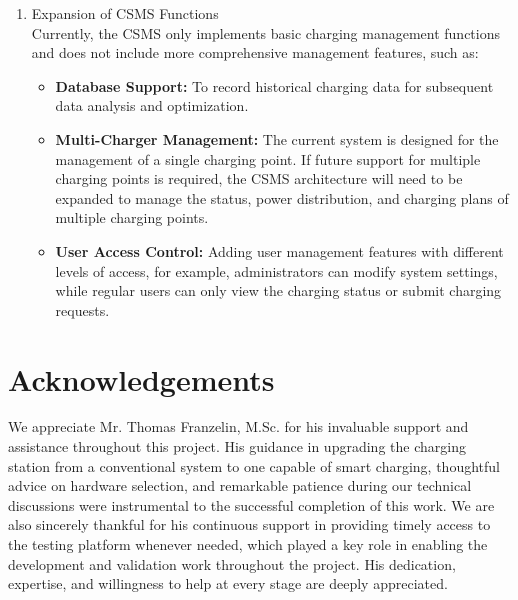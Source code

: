 \documentclass[
	english,
	ruledheaders=section,%
	class=report,%
	thesis={type=Report},%
	accentcolor=9c,%
	custommargins=true,%
	marginpar=false,%
	parskip=half-,%
	fontsize=11pt,%
	logofile={img/tuda_logo.pdf}, %
]{tudapub}
\begin{document}
\begin{enumerate}
    \item Expansion of \ac{CSMS} Functions\\
Currently, the \ac{CSMS} only implements basic charging management functions and does not include more comprehensive management features, such as:
    \begin{itemize}
        \item \textbf{Database Support:} To record historical charging data for subsequent data analysis and optimization.
        \item \textbf{Multi-Charger Management:} The current system is designed for the management of a single charging point. If future support for multiple charging points is required, the \ac{CSMS} architecture will need to be expanded to manage the status, power distribution, and charging plans of multiple charging points.
        \item \textbf{User Access Control:} Adding user management features with different levels of access, for example, administrators can modify system settings, while regular users can only view the charging status or submit charging requests.
    \end{itemize}

\end{enumerate}

\chapter{Acknowledgements}
We appreciate Mr. Thomas Franzelin, M.Sc. for his invaluable support and assistance throughout this project. His guidance in upgrading the charging station from a conventional system to one capable of smart charging, thoughtful advice on hardware selection, and remarkable patience during our technical discussions were instrumental to the successful completion of this work. We are also sincerely thankful for his continuous support in providing timely access to the testing platform whenever needed, which played a key role in enabling the development and validation work throughout the project. His dedication, expertise, and willingness to help at every stage are deeply appreciated.
\end{document}
